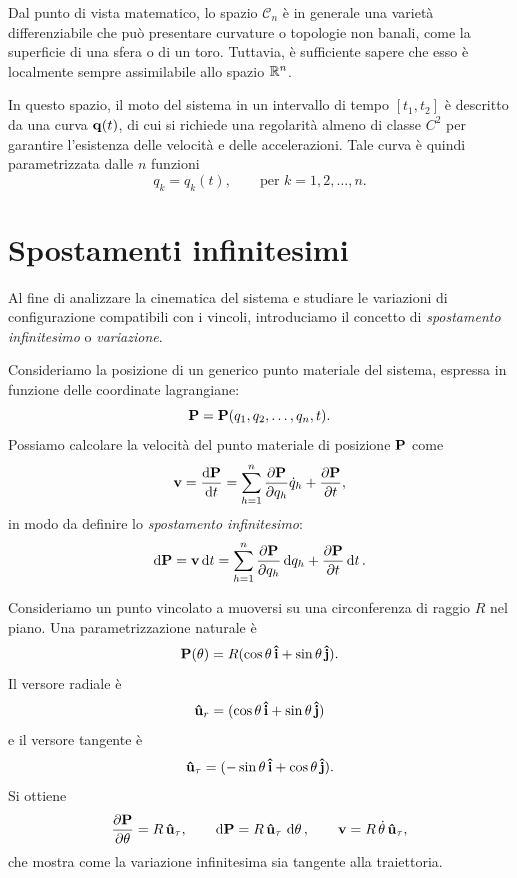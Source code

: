 Dal punto di vista matematico, lo spazio $\mathcal{C}_n$ è in generale una varietà differenziabile che può presentare curvature o topologie non banali, come la superficie di una sfera o di un toro. Tuttavia, è sufficiente sapere che esso è localmente sempre assimilabile allo spazio $\mathbb{R}^n$.

In questo spazio, il moto del sistema in un intervallo di tempo $[t_1, t_2]$ è descritto da una curva $\vb{q}(t)$, di cui si richiede una regolarità almeno di classe $C^2$ per garantire l'esistenza delle velocità e delle accelerazioni. Tale curva è quindi parametrizzata dalle $n$ funzioni
\begin{equation*}
    q_k = q_k(t), \qquad \text{per } k = 1, 2, \dots, n.
\end{equation*}

\section{Spostamenti infinitesimi}

Al fine di analizzare la cinematica del sistema e studiare le variazioni di configurazione compatibili con i vincoli, introduciamo il concetto di \emph{spostamento infinitesimo} o \emph{variazione}.

Consideriamo la posizione di un generico punto materiale del sistema, espressa in funzione delle coordinate lagrangiane:
\begin{equation*}
    \vb{P} = \vb{P}(q_1, q_2, \dots, q_n, t).
\end{equation*}
Possiamo calcolare la velocità del punto materiale di posizione $\vb{P}$ come
\begin{equation*}
    \vb{v} = \dv{\vb{P}}{t} = \sum_{h=1}^n \pdv{\vb{P}}{q_h} \dot{q}_h + \pdv{\vb{P}}{t},
\end{equation*}
in modo da definire lo \emph{spostamento infinitesimo}:
\begin{equation*}
    \dd{\vb{P}} = \vb{v} \dd{t} = \sum_{h=1}^n \pdv{\vb{P}}{q_h} \dd{q_h} + \pdv{\vb{P}}{t} \dd{t}.
\end{equation*}

\begin{example}
Consideriamo un punto vincolato a muoversi su una circonferenza di raggio $R$ nel piano. Una parametrizzazione naturale è
\[
    \vb{P}(\theta) = R(\cos\theta\,\vu{i} + \sin\theta\,\vu{j}).
\]
Il versore radiale è 
\[
\vu{u}_r = (\cos\theta\,\vu{i} + \sin\theta\,\vu{j})
\]
e il versore tangente è
\[
    \vu{u}_\tau = (-\sin\theta\,\vu{i} + \cos\theta\,\vu{j}).
\]
Si ottiene
\[
    \pdv{\vb{P}}{\theta} = R\,\vu{u}_\tau,
    \qquad
    \dd{\vb{P}} = R\,\vu{u}_\tau\,\dd{\theta},
    \qquad
    \vb{v} = R\,\dot{\theta}\,\vu{u}_\tau,
\]
che mostra come la variazione infinitesima sia tangente alla traiettoria.
\end{example}

